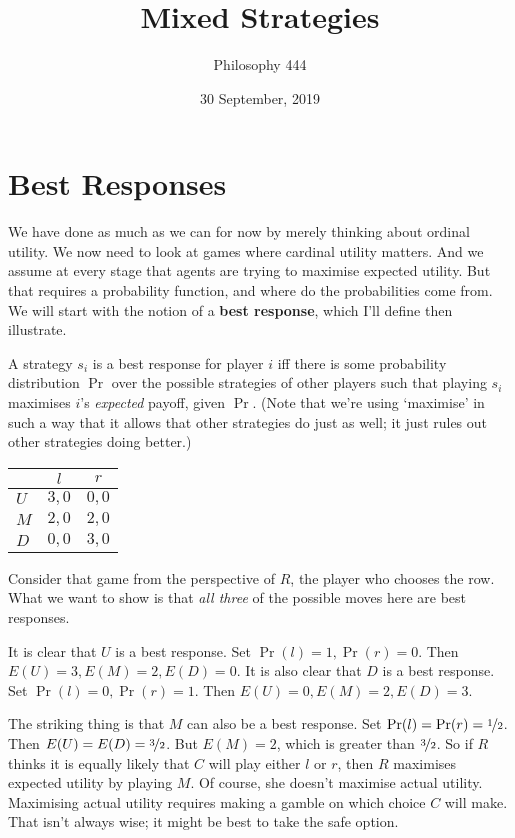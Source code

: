 \documentclass[11pt,]{article}
\title{Mixed Strategies}
\author{Philosophy 444}
\date{30 September, 2019}
\providecommand{\tightlist}{%
  \setlength{\itemsep}{0pt}\setlength{\parskip}{0pt}}
\begin{document}
\maketitle

\hypertarget{best-responses}{%
\section{Best Responses}\label{best-responses}}

We have done as much as we can for now by merely thinking about ordinal
utility. We now need to look at games where cardinal utility matters.
And we assume at every stage that agents are trying to maximise expected
utility. But that requires a probability function, and where do the
probabilities come from. We will start with the notion of a \textbf{best
response}, which I'll define then illustrate.

\begin{description}
\tightlist
\item[Best Response]
A strategy \(s_i\) is a best response for player \(i\) iff there is some
probability distribution \(\Pr\) over the possible strategies of other
players such that playing \(s_i\) maximises \(i\)'s \emph{expected}
payoff, given \(\Pr\). (Note that we're using `maximise' in such a way
that it allows that other strategies do just as well; it just rules out
other strategies doing better.)
\end{description}

\bigskip

\begin{longtable}[]{@{}lcc@{}}
\toprule
& \(l\) & \(r\)\tabularnewline
\midrule
\endhead
\(U\) & \(3,0\) & \(0,0\)\tabularnewline
\(M\) & \(2,0\) & \(2,0\)\tabularnewline
\(D\) & \(0,0\) & \(3,0\)\tabularnewline
\bottomrule
\end{longtable}

Consider that game from the perspective of \(R\), the player who chooses
the row. What we want to show is that \emph{all three} of the possible
moves here are best responses.

It is clear that \(U\) is a best response. Set
\(\Pr(l) = 1, \Pr(r) = 0\). Then \(E(U) = 3, E(M) = 2, E(D) = 0\). It is
also clear that \(D\) is a best response. Set
\(\Pr(l) = 0, \Pr(r) = 1\). Then \(E(U) = 0, E(M) = 2, E(D) = 3\).

The striking thing is that \(M\) can also be a best response. Set
\(\Pr(l) = \Pr(r) = \nicefrac{1}{2}\). Then
\(E(U) = E(D) = \nicefrac{3}{2}\). But \(E(M) = 2\), which is greater
than \(\nicefrac{3}{2}\). So if \(R\) thinks it is equally likely that
\(C\) will play either \(l\) or \(r\), then \(R\) maximises expected
utility by playing \(M\). Of course, she doesn't maximise actual
utility. Maximising actual utility requires making a gamble on which
choice \(C\) will make. That isn't always wise; it might be best to take
the safe option.
\end{document}
